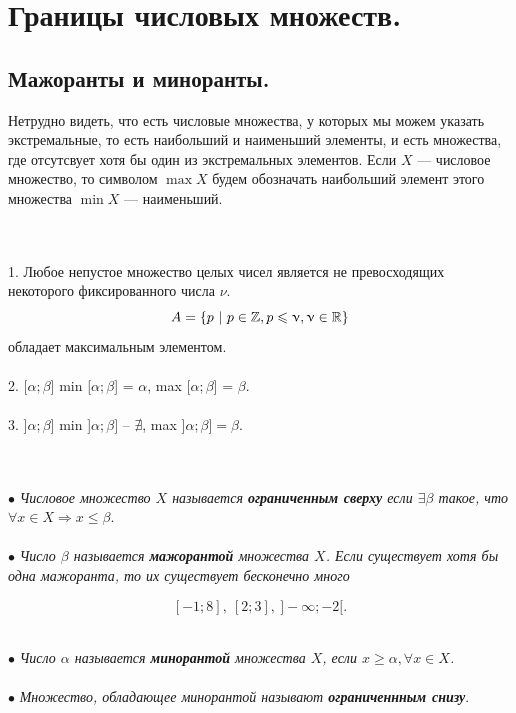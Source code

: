 \chapter{Границы числовых множеств.}
\section{Мажоранты и миноранты.}
Нетрудно видеть, что есть числовые множества, у которых мы можем указать экстремальные, то есть наибольший и наименьший элементы, и есть множества, где отсутсвует хотя бы один из экстремальных элементов. Если $X$ --- числовое множество, то символом $\max X$ будем обозначать наибольший элемент этого множества $\min X$ --- наименьший.\\
\begin{example}\\\\
	1. Любое непустое множество целых чисел является не превосходящих некоторого фиксированного числа $\nu$.
	$$A=\{p \ |\  p \in \mathbb{Z}, p \leqslant \upnu, \upnu \in \mathbb{R} \}$$
	обладает максимальным элементом.\\\\
	2. [$\alpha; \beta$] min [$\alpha; \beta$] = $\alpha$, max [$\alpha; \beta$] = $\beta$.\\\\
	3. ]$\alpha; \beta]$ min ]$\alpha; \beta]$ -- $\nexists$, max ]$\alpha; \beta] = \beta$.
\end{example}\\\\
$\bullet$ \textit{Числовое множество $X$ называется \textbf{ограниченным сверху} если $\exists \beta$ такое, что $\forall x \in X \Rightarrow x \leqslant \beta$}.\\\\
$\bullet$ \textit{Число $\beta$ называется \textbf{мажорантой} множества $X$. Если существует хотя бы одна мажоранта, то их существует бесконечно много}\\
\begin{example}
	\[ [-1; 8 ],\ [2 ; 3],\ ]-\infty; -2[.\]
\end{example}\\
$\bullet$ \textit{Число $\alpha$ называется \textbf{минорантой} множества $X$, если $x \geqslant \alpha, \forall x \in X$.}\\\\
$\bullet$ \textit{Множество, обладающее минорантой называют \textbf{ограниченнным снизу}}.\\\\
